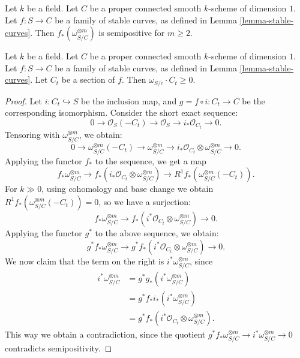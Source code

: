 \begin{lemma}[cf.\ {\cite[Theorem 4.3]{Ko90}}]
\label{lemma-stable-curves-semipositive}
Let $k$ be a field.
Let $C$ be a proper connected smooth $k$-scheme of dimension $1$.
Let $f : S \to C$ be a family of stable curves,
as defined in Lemma \ref{lemma-stable-curves}.
Then $f_*(\omega_{S/C}^{\otimes m})$ is semipositive for $m \geq 2$.


\end{lemma}


\begin{lemma}[cf.\ {\cite[Theorem 4.6]{Ko90}}]
\label{lemma-stable-curves-semipositive}
Let $k$ be a field.
Let $C$ be a proper connected smooth $k$-scheme of dimension $1$.
Let $f : S \to C$ be a family of stable curves,
as defined in Lemma \ref{lemma-stable-curves}.
Let $C_t$ be a section of $f$.
Then $\omega_{S/c}\cdot C_t\geq 0$.
\end{lemma}

\begin{proof}
Let $i:C_t\hookrightarrow S$ be the inclusion map, and $g=f\circ i:C_t\to C$ be the corresponding isomorphism.
Consider the short exact sequence:
$$0\to \mathcal{O}_S(-C_t)\to\mathcal{O}_S\to i_*\mathcal{O}_{C_t}\to 0.$$
Tensoring with $\omega_{S/C}^{\otimes m}$, we obtain:
$$0\to \omega_{S/C}^{\otimes m}(-C_t)\to \omega_{S/C}^{\otimes m}\to i_*\mathcal{O}_{C_t}\otimes\omega_{S/C}^{\otimes m}\to 0.$$
Applying the functor $f_*$ to the sequence, we get a map
$$f_*\omega_{S/C}^{\otimes m}\to f_*(i_*\mathcal{O}_{C_t}\otimes \omega_{S/C}^{\otimes m})\to R^1f_*(\omega_{S/C}^{\otimes m}(-C_t)).$$
For $k\gg 0$, using cohomology and base change we obtain $R^1f_*(\omega_{S/C}^{\otimes m}(-C_t))=0$, so we have a surjection:
$$f_*\omega_{S/C}^{\otimes m}\to f_*(i^*\mathcal{O}_{C_t}\otimes \omega_{S/C}^{\otimes m})\to 0.$$
Applying the functor $g^*$ to the above sequence, we obtain:
$$g^*f_*\omega_{S/C}^{\otimes m}\to g^*f_*(i^*\mathcal{O}_{C_t}\otimes \omega_{S/C}^{\otimes m})\to 0.$$
We now claim that the term on the right is $i^*\omega_{S/C}^{\otimes m}$, since
\begin{align}
i^*\omega_{S/C}^{\otimes m}& =g^*g_*(i^*\omega_{S/C}^{\otimes m})\nonumber\\
& =g^*f_*i_*(i^*\omega_{S/C}^{\otimes m})\nonumber\\
&=g^*f_*(i^*\mathcal{O}_{C_t}\otimes \omega_{S/C}^{\otimes m}).\nonumber
\end{align}
This way we obtain a contradiction, since the quotient $g^*f_*\omega_{S/C}^{\otimes m}\to i^*\omega_{S/C}^{\otimes m}\to 0$ contradicts semipositivity. 
\end{proof}


